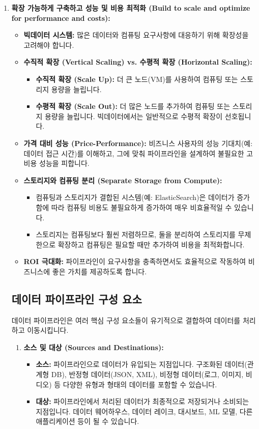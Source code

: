 \documentclass[11pt,a4paper]{article}
\begin{document}
\begin{enumerate}
    \item \textbf{확장 가능하게 구축하고 성능 및 비용 최적화 (Build to scale and optimize for performance and costs):}
    \begin{itemize}
        \item \textbf{빅데이터 시스템:} 많은 데이터와 컴퓨팅 요구사항에 대응하기 위해 확장성을 고려해야 합니다.
        \item \textbf{수직적 확장 (Vertical Scaling) vs. 수평적 확장 (Horizontal Scaling):}
        \begin{itemize}
            \item \textbf{수직적 확장 (Scale Up):} 더 큰 노드(VM)를 사용하여 컴퓨팅 또는 스토리지 용량을 늘립니다.
            \item \textbf{수평적 확장 (Scale Out):} 더 많은 노드를 추가하여 컴퓨팅 또는 스토리지 용량을 늘립니다. 빅데이터에서는 일반적으로 수평적 확장이 선호됩니다.
        \end{itemize}
        \item \textbf{가격 대비 성능 (Price-Performance):} 비즈니스 사용자의 성능 기대치(예: 데이터 접근 시간)를 이해하고, 그에 맞춰 파이프라인을 설계하여 불필요한 고비용 성능을 피합니다.
        \item \textbf{스토리지와 컴퓨팅 분리 (Separate Storage from Compute):}
        \begin{itemize}
            \item 컴퓨팅과 스토리지가 결합된 시스템(예: ElasticSearch)은 데이터가 증가함에 따라 컴퓨팅 비용도 불필요하게 증가하여 매우 비효율적일 수 있습니다.
            \item 스토리지는 컴퓨팅보다 훨씬 저렴하므로, 둘을 분리하여 스토리지를 무제한으로 확장하고 컴퓨팅은 필요할 때만 추가하여 비용을 최적화합니다.
        \end{itemize}
        \item \textbf{ROI 극대화:} 파이프라인이 요구사항을 충족하면서도 효율적으로 작동하여 비즈니스에 좋은 가치를 제공하도록 합니다.
    \end{itemize}

\newpage
\subsection{데이터 파이프라인 구성 요소}

데이터 파이프라인은 여러 핵심 구성 요소들이 유기적으로 결합하여 데이터를 처리하고 이동시킵니다.

\begin{enumerate}
    \item \textbf{소스 및 대상 (Sources and Destinations):}
    \begin{itemize}
        \item \textbf{소스:} 파이프라인으로 데이터가 유입되는 지점입니다. 구조화된 데이터(관계형 DB), 반정형 데이터(JSON, XML), 비정형 데이터(로그, 이미지, 비디오) 등 다양한 유형과 형태의 데이터를 포함할 수 있습니다.
        \item \textbf{대상:} 파이프라인에서 처리된 데이터가 최종적으로 저장되거나 소비되는 지점입니다. 데이터 웨어하우스, 데이터 레이크, 대시보드, ML 모델, 다른 애플리케이션 등이 될 수 있습니다.
    \end{itemize}


\end{enumerate}
\end{enumerate}
\end{document}
